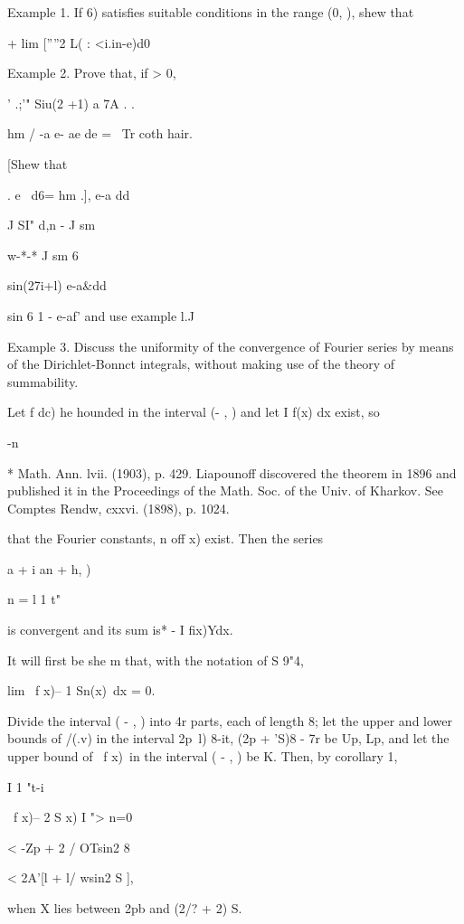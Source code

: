 Example 1. If 6) satisfies suitable conditions in the range (0, \pi),
shew that

+ lim [''''2 L( : <i.in-e)d0

Example 2. Prove that, if > 0,

' .;'" Siu(2 +1) a 7A . .

hm / -a e- ae de = \ Tr coth hair.

 [Shew that

  . e~ d6= hm .], e-a dd

J SI" d,n - J sm

w-*-* J sm 6

  sin(27i+l) e-a\&dd

sin 6 1 - e-af' and use example l.J

Example 3. Discuss the uniformity of the convergence of Fourier series
by means of the Dirichlet-Bonnct integrals, without making use of the
theory of summability.

Let f dc) he hounded in the interval (- \pi, \pi) and let I f(x) dx
exist, so

 -n

* Math. Ann. lvii. (1903), p. 429. Liapounoff discovered the theorem
in 1896 and published it in the Proceedings of the Math. Soc. of the
Univ. of Kharkov. See Comptes Rendw, cxxvi. (1898), p. 1024.

%
%

that the Fourier constants, n off x) exist. Then the series

 a + i an + h, )

n = l 1 t"

is convergent and its sum is* - I fix)Ydx.

It will first be she m that, with the notation of S 9"4,

lim \ f x)-- 1 Sn(x)\ dx = 0.

Divide the interval ( - \pi, \pi) into 4r parts, each of length 8; let
the upper and lower bounds of /(.v) in the interval 2p~l) 8-it, (2p +
'S)8 - 7r be Up, Lp, and let the upper bound of \ f x)\ in the
interval ( - \pi, \pi) be K. Then, by  corollary 1,

I 1 "t-i

\ f x)-- 2 S x) I "> n=0

< -Zp + 2 / OTsin2 8

< 2A'[l + l/ wsin2 S ],

when X lies between 2pb and (2/? + 2) S.

